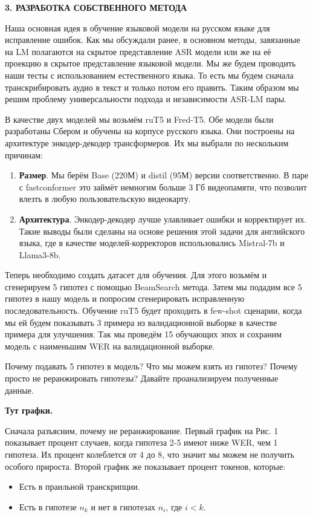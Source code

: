 \newpage
\begin{center}
  \textbf{\large 3. РАЗРАБОТКА СОБСТВЕННОГО МЕТОДА}
\end{center}

Наша основная идея в обучение языковой модели на русском языке для исправление ошибок.
Как мы обсуждали ранее, в основном методы, завязанные на LM полагаются на скрытое представление ASR модели или же на её проекцию в скрытое представление языковой модели.
Мы же будем проводить наши тесты с использованием естественного языка.
То есть мы будем сначала транскрибировать аудио в текст и только потом его править.
Таким образом мы решим проблему универсальности подхода и независимости ASR-LM пары.

В качестве двух моделей мы возьмём ruT5 и Fred-T5.
Обе модели были разработаны Сбером и обучены на корпусе русского языка.
Они построены на архитектуре энкодер-декодер трансформеров.
Их мы выбрали по нескольким причинам:

\begin{enumerate}
  \item \textbf{Размер}.
  Мы берём Base (220М) и distil (95М) версии соответственно. 
  В паре с fastconformer это займёт немногим больше 3 Гб видеопамяти, что позволит влезть в любую пользовательскую видеокарту.
  \item \textbf{Архитектура}.
  Энкодер-декодер лучше улавливает ошибки и корректирует их.
  Такие выводы были сделаны на основе решения этой задачи для английского языка, где в качестве моделей-корректоров использовались Mistral-7b и Llama3-8b.
\end{enumerate}

Теперь необходимо создать датасет для обучения.
Для этого возьмём и сгенерируем 5 гипотез с помощью BeamSearch метода.
Затем мы подадим все 5 гипотез в нашу модель и попросим сгенерировать исправленную последовательность.
Обучение ruT5 будет проходить в few-shot сценарии, когда мы ей будем показывать 3 примера из валидационной выборке в качестве примера для улучшения.
Так мы проведём 15 обучающих эпох и сохраним модель с наименьшим WER на валидационной выборке.

Почему подавать 5 гипотез в модель? Что мы можем взять из гипотез?
Почему просто не реранжировать гипотезы?
Давайте проанализируем полученные данные.

\textbf{Тут графки.}

Сначала разъясним, почему не реранжирование.
Первый график на Рис. 1 показывает процент случаев, когда гипотеза 2-5 имеют ниже WER, чем 1 гипотеза.
Их процент колеблется от 4 до 8, что значит мы можем не получить особого прироста.
Второй график же показывает процент токенов, которые:
\begin{itemize}
  \item Есть в праильной транскрипции.
  \item Есть в гипотезе $n_k$ и нет в гипотезах $n_i$, где $i < k$.
\end{itemize}

